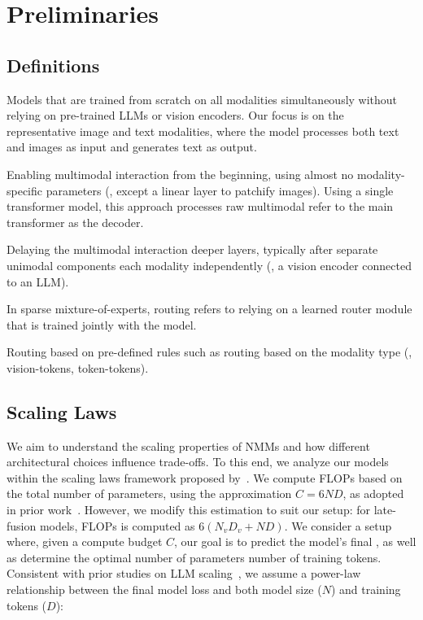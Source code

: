 \section{Preliminaries}



\subsection{Definitions}

Models that are trained from scratch on all modalities simultaneously without
relying on pre-trained LLMs or vision encoders. Our focus is on the
representative image and text modalities, where the model processes both text
and images as input and generates text as output.

 Enabling multimodal interaction from the beginning, using
almost no modality-specific parameters (\eg, except a linear layer to patchify
images). Using a single transformer model, this approach processes raw
multimodal   refer to the main transformer as
the decoder.

 Delaying the multimodal interaction  deeper layers,
typically after separate unimodal components  each modality
independently (\eg, a vision encoder connected to an LLM).

 In sparse mixture-of-experts,  routing
refers to relying on a learned router module that is trained jointly with the
model.

 Routing based on pre-defined rules such as
routing based on the modality type (\eg, vision-tokens, token-tokens).






\subsection{Scaling Laws}
We aim to understand the scaling properties of NMMs and how different
architectural choices influence trade-offs. To this end, we analyze our models
within the scaling laws framework proposed by~\citet{kaplan2020scaling,
hoffmann2022training}.
We compute FLOPs based on the total number of parameters, using the
approximation \(C = 6ND\), as adopted in prior
work~\citep{hoffmann2022training,abnar2025parameters}. However, we modify this
estimation to suit our setup: for late-fusion models, FLOPs is computed as
\(6(N_vD_v + ND)\).
We consider a setup where, given a compute budget \(C\), our goal is to predict
the model’s final , as well as determine the optimal number of
parameters  number of training tokens. Consistent with prior studies on LLM
scaling~\citep{hoffmann2022training}, we assume a power-law relationship between
the final model loss and both model size (\(N\)) and training tokens (\(D\)):




